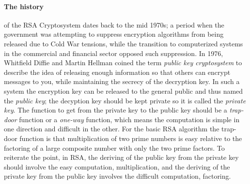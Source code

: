 \documentclass[12pt]{article}
\theoremstyle{remark}
\begin{document}
\paragraph{The history} of the RSA Cryptosystem dates back to the mid 1970s; a period when the government was attempting to suppress encryption algorithms  from being released due to Cold War tensions, while the transition to computerized systems in the commercial and financial sector opposed such suppression.  In 1976, Whitfield Diffie and Martin Hellman coined the term \textit{public key cryptosystem} to describe the idea of releasing enough information so that others can encrypt messages to you, while maintaining the secrecy of the decryption key.  In such a system the encryption key can be released to the general public and thus named the \textit{public key}; the decyption key should be kept private so it is called the \textit{private key}.  The function to get from the private key to the public key should be a \textit{trap-door} function or a \textit{one-way} function, which means the computation is simple in one direction and difficult in the other.  For the basic RSA algorithm the trap-door function is that multiplication of two prime numbers is easy relative to the factoring of a large composite number with only the two prime factors.  To reiterate the point, in RSA, the deriving of the public key from the private key should involve the easy computation, multiplication, and the deriving of the private key from the public key involves the difficult computation, factoring.
\end{document}
